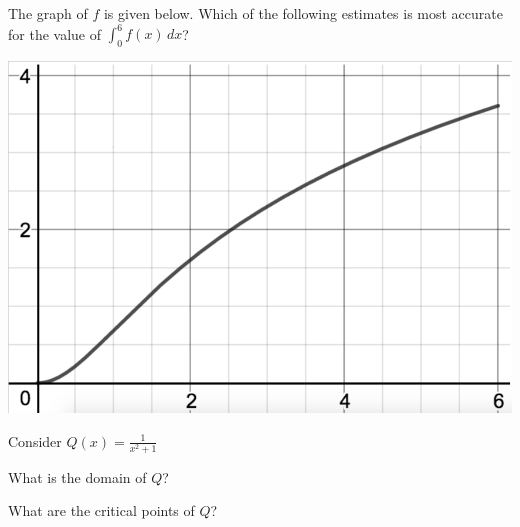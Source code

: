 \documentclass[handout]{ximera}
\begin{document}
\begin{problem}
The graph of $f$ is given below. Which of the following estimates is most accurate for the value of $\displaystyle\int_0^6 f(x)\, dx$?

\includegraphics [scale=0.5]{Area-Ex3.png} %

\begin{multipleChoice}
\end{multipleChoice}
\end{problem}


\begin{problem}
Consider $Q(x)=\displaystyle\frac{1}{x^2+1}$

\begin{question}
What is the domain of $Q$?
\begin{multipleChoice}
	\choice [correct]{$(-\infty,\infty)$}
\end{multipleChoice}
\end{question}

\begin{question}
What are the critical points of $Q$?
\begin{multipleChoice}
\end{multipleChoice}
\end{question}

\end{problem}
\end{document}
